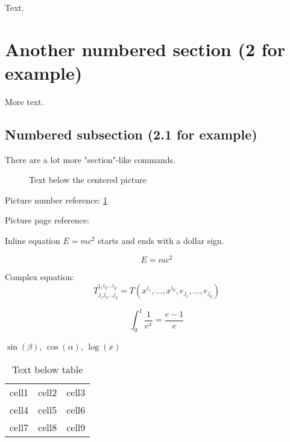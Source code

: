 \documentclass[12pt, a4paper]{article} %
\begin{document}
Text.

\section{Another numbered section (2 for example)}

More text.
 
\subsection{Numbered subsection (2.1 for example)}

There are a lot more "section"-like commands.



\begin{figure}[h] %
    \centering
    \caption{Text below the centered picture}
    \label{fig:mozilla_picture_label}
\end{figure}
 
Picture number reference: \ref{fig:mozilla_picture_label}

Picture page reference: \pageref{fig:mozilla_picture_label} 



Inline equation $E=mc^2$ starts and ends with a dollar sign.

\begin{equation} %
E=mc^2
\end{equation}

Complex equation:
$$T^{i_1 i_2 \dots i_p}_{j_1 j_2 \dots j_q} = T(x^{i_1},\dots,x^{i_p},e_{j_1},\dots,e_{j_q})$$

$$\int_0^1 \frac{1}{e^x} =  \frac{e-1}{e}$$

$\sin(\beta)$, $\cos(\alpha)$, $\log(x)$



\begin{center}

\begin{table}[H] %
\centering

\begin{tabular}{ |l|c|r| } %
\hline                     %
cell1 & cell2 & cell3 \\   %
cell4 & cell5 & cell6 \\  
cell7 & cell8 & cell9 \\
\hline                     %
\end{tabular}

\caption{Text below table}
\label{table:sample_table_label}
\end{table}

\end{center}
\end{document}
